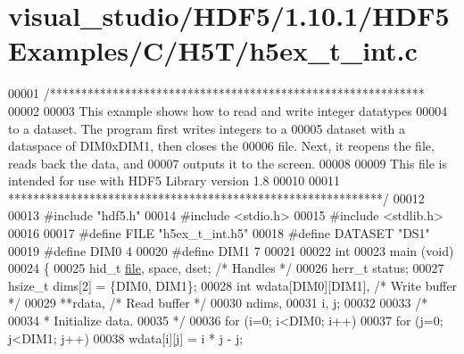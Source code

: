 \hypertarget{visual__studio_2_h_d_f5_21_810_81_2_h_d_f5_examples_2_c_2_h5_t_2h5ex__t__int_8c_source}{}\section{visual\+\_\+studio/\+H\+D\+F5/1.10.1/\+H\+D\+F5\+Examples/\+C/\+H5\+T/h5ex\+\_\+t\+\_\+int.c}
\label{visual__studio_2_h_d_f5_21_810_81_2_h_d_f5_examples_2_c_2_h5_t_2h5ex__t__int_8c_source}

\begin{DoxyCode}
00001 \textcolor{comment}{/************************************************************}
00002 \textcolor{comment}{}
00003 \textcolor{comment}{  This example shows how to read and write integer datatypes}
00004 \textcolor{comment}{  to a dataset.  The program first writes integers to a}
00005 \textcolor{comment}{  dataset with a dataspace of DIM0xDIM1, then closes the}
00006 \textcolor{comment}{  file.  Next, it reopens the file, reads back the data, and}
00007 \textcolor{comment}{  outputs it to the screen.}
00008 \textcolor{comment}{}
00009 \textcolor{comment}{  This file is intended for use with HDF5 Library version 1.8}
00010 \textcolor{comment}{}
00011 \textcolor{comment}{ ************************************************************/}
00012 
00013 \textcolor{preprocessor}{#include "hdf5.h"}
00014 \textcolor{preprocessor}{#include <stdio.h>}
00015 \textcolor{preprocessor}{#include <stdlib.h>}
00016 
00017 \textcolor{preprocessor}{#define FILE            "h5ex\_t\_int.h5"}
00018 \textcolor{preprocessor}{#define DATASET         "DS1"}
00019 \textcolor{preprocessor}{#define DIM0            4}
00020 \textcolor{preprocessor}{#define DIM1            7}
00021 
00022 \textcolor{keywordtype}{int}
00023 main (\textcolor{keywordtype}{void})
00024 \{
00025     hid\_t       \hyperlink{structfile}{file}, space, dset;          \textcolor{comment}{/* Handles */}
00026     herr\_t      status;
00027     hsize\_t     dims[2] = \{DIM0, DIM1\};
00028     \textcolor{keywordtype}{int}         wdata[DIM0][DIM1],          \textcolor{comment}{/* Write buffer */}
00029                 **rdata,                    \textcolor{comment}{/* Read buffer */}
00030                 ndims,
00031                 i, j;
00032 
00033     \textcolor{comment}{/*}
00034 \textcolor{comment}{     * Initialize data.}
00035 \textcolor{comment}{     */}
00036     \textcolor{keywordflow}{for} (i=0; i<DIM0; i++)
00037         \textcolor{keywordflow}{for} (j=0; j<DIM1; j++)
00038             wdata[i][j] = i * j - j;

\end{DoxyCode}
